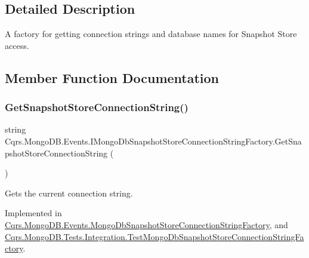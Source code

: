 \subsection{Detailed Description}
A factory for getting connection strings and database names for Snapshot Store access. 



\subsection{Member Function Documentation}
\mbox{\label{interfaceCqrs_1_1MongoDB_1_1Events_1_1IMongoDbSnapshotStoreConnectionStringFactory_a634bf6d5d35873cde881588a4ea5f546_a634bf6d5d35873cde881588a4ea5f546}} 
\subsubsection{\texorpdfstring{Get\+Snapshot\+Store\+Connection\+String()}{GetSnapshotStoreConnectionString()}}
{\footnotesize\ttfamily string Cqrs.\+Mongo\+D\+B.\+Events.\+I\+Mongo\+Db\+Snapshot\+Store\+Connection\+String\+Factory.\+Get\+Snapshot\+Store\+Connection\+String (\begin{DoxyParamCaption}{ }\end{DoxyParamCaption})}



Gets the current connection string. 



Implemented in \hyperlink{classCqrs_1_1MongoDB_1_1Events_1_1MongoDbSnapshotStoreConnectionStringFactory_abe5f66b50fd726fac198836a54e8437b_abe5f66b50fd726fac198836a54e8437b}{Cqrs.\+Mongo\+D\+B.\+Events.\+Mongo\+Db\+Snapshot\+Store\+Connection\+String\+Factory}, and \hyperlink{classCqrs_1_1MongoDB_1_1Tests_1_1Integration_1_1TestMongoDbSnapshotStoreConnectionStringFactory_ab75d7becd2ca0feb70315778cfa63b9c_ab75d7becd2ca0feb70315778cfa63b9c}{Cqrs.\+Mongo\+D\+B.\+Tests.\+Integration.\+Test\+Mongo\+Db\+Snapshot\+Store\+Connection\+String\+Factory}.

